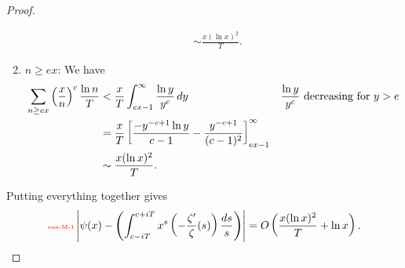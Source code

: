 \begin{proof}
\begin{enumerate}
\begin{align*}
&\sim\frac{x(\ln x)^2}{T}.
\end{align*}
\item $n\ge ex$: We have
\begin{align*}
\sum_{n\ge ex} \left( {\frac{x}{n}} \right)^c \frac{\ln n}{T}&<\frac{x}{T}\int_{ex-1}^{\infty} \frac{\ln y}{y^c}\,dy&\frac{\ln y}{y^c}\text{ decreasing for }y>e\\
&=\frac xT\left[ {\frac{-y^{-c+1}\ln y}{c-1}-\frac{y^{-c+1}}{(c-1)^2}} \right]^{\infty}_{ex-1}\\
&\sim \frac{x(\ln x)^2}{T}.
\end{align*}
\end{enumerate}
Putting everything together gives
\begin{equation}\llabel{von-M-1}
\ab{\psi(x)-\pa{
\int_{c-iT}^{c+iT} x^s\pa{-\fc{\ze'}{\ze}(s)}\frac{ds}s
}}=O\pa{\frac{x(\ln x)^2}{T}+\ln x}.
\end{equation}


\end{proof}
